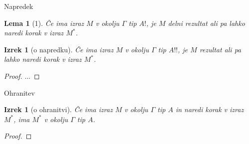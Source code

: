 \documentclass{beamer}
\theoremstyle{definition} %
\theoremstyle{plain} %
\newtheorem{lema}[definicija]{Lema}
\newtheorem{izrek}[definicija]{Izrek}
\begin{document}
	

	
	\begin{frame}{Napredek}
		\begin{lema}[1]
			Če ima izraz $M$ v okolju $\Gamma$ tip $A!$, je $M$ delni rezultat ali pa lahko naredi korak v izraz $M^*$.
		\end{lema}
		
		
					
		\begin{izrek}[o napredku]
			Če ima izraz $M$ v okolju $\Gamma$ tip $A!!$, je $M$ rezultat ali pa lahko naredi korak v izraz $M^*$.
		\end{izrek}
		
		\begin{proof}
			... 
		\end{proof}
		
	\end{frame}

	
		
	\begin{frame}{Ohranitev}
				
		\begin{izrek}[o ohranitvi]
			Če ima izraz $M$ v okolju $\Gamma$ tip $A$ in naredi korak v izraz $M^*$, ima $M^*$ v okolju $\Gamma$ tip $A$.
		\end{izrek}
		
		\begin{proof}
		\end{proof}
		
	\end{frame}
\end{document}
